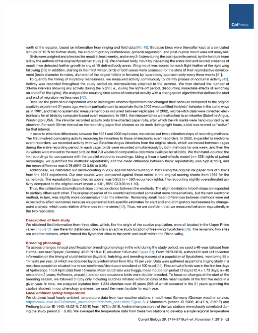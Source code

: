 \documentclass[a4paper, twoside]{templates/ociamthesis}
\begin{document}
\begin{center}\includegraphics[width=1\linewidth]{pdf_chapters/pied/pied_crop_Part08} \end{center}
\end{document}
